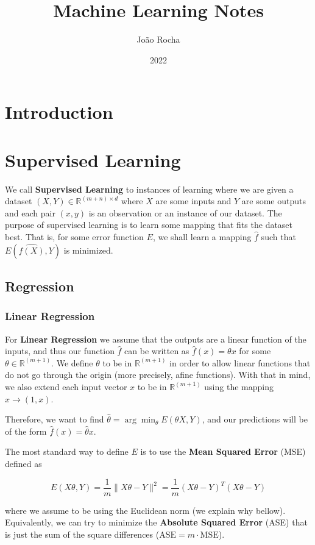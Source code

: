 \documentclass{article}
\title{Machine Learning Notes}
\date{2022}
\author{João Rocha}
\newcommand{\R}{\mathbb{R}}
\begin{document}
\maketitle

\section{Introduction}

\section{Supervised Learning}

We call \textbf{Supervised Learning} to instances of learning where we are given a dataset $(X, Y) \in \R^{(m + n) \times d}$ where $X$ are some inputs and $Y$ are some outputs and each pair $(x, y)$ is an observation or an instance of our dataset. 
The purpose of supervised learning is to learn some mapping that fits the dataset best. 
That is, for some error function $E$, we shall learn a mapping $\hat{f}$ such that $E(\hat{f(X)}, Y)$ is minimized.

\subsection{Regression}

\subsubsection{Linear Regression}

For \textbf{Linear Regression} we assume that the outputs are a linear function of the inputs, and thus our function $\hat{f}$ can be written as $\hat{f}(x) = \theta x$ for some $\theta \in \R^{(m+1)}$.
We define $\theta$ to be in $\R^{(m+1)}$ in order to allow linear functions that do not go through the origin (more precisely, afine functions).
With that in mind, we also extend each input vector $x$ to be in $\R^{(m+1)}$ using the mapping $x \to (1, x)$.

Therefore, we want to find $\hat{\theta} = \arg \min_\theta E(\theta X, Y)$, and our predictions will be of the form $\hat{f}(x) = \hat{\theta}x$.

The most standard way to define $E$ is to use the \textbf{Mean Squared Error} (MSE) defined as 

$$
E(X \theta, Y) = \frac{1}{m} \|X \theta - Y\|^2 = \frac{1}{m} (X \theta - Y)^T (X \theta - Y)
$$

where we assume to be using the Euclidean norm (we explain why bellow).
Equivalently, we can try to minimize the \textbf{Absolute Squared Error} (ASE) that is just the sum of the square differences ($\text{ASE} = m \cdot \text{MSE}$).
\end{document}
